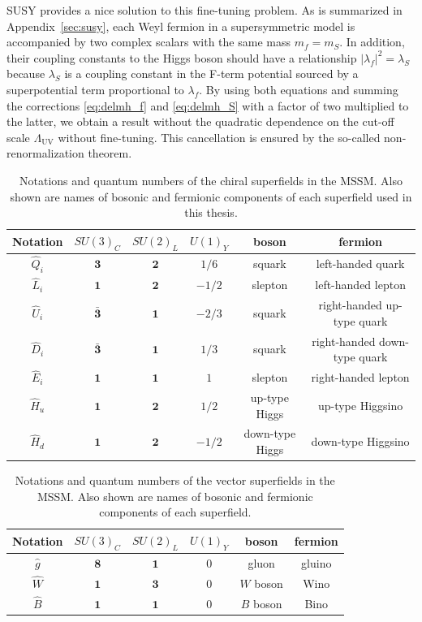 \documentclass[12pt,twoside,book]{article}
\begin{document}
SUSY provides a nice solution to this fine-tuning problem.
As is summarized in Appendix~\ref{sec:susy}, each Weyl fermion in a supersymmetric model is accompanied by two complex scalars with the same mass $m_f = m_S$.
In addition, their coupling constants to the Higgs boson should have a relationship $|\lambda_f|^2 = \lambda_S$ because $\lambda_S$ is a coupling constant in the F-term potential sourced by a superpotential term proportional to $\lambda_f$.
By using both equations and summing the corrections \eqref{eq:delmh_f} and \eqref{eq:delmh_S} with a factor of two multiplied to the latter, we obtain a result without the quadratic dependence on the cut-off scale $\Lambda_{\mathrm{UV}}$ without fine-tuning.
This cancellation is ensured by the so-called non-renormalization theorem. \cite{Salam:1974jj, Grisaru:1979wc}

\begin{table}[t]
  \centering
  \begin{tabular}{c|ccc|cc}
    Notation & $SU(3)_C$ & $SU(2)_L$ & $U(1)_Y$ & boson & fermion \\ \hline
    $\hat{Q}_i$ & $\bm{3}$ & $\bm{2}$ & $1/6$ & squark & left-handed quark \\
    $\hat{L}_i$ & $\bm{1}$ & $\bm{2}$ & $-1/2$ & slepton & left-handed lepton \\
    $\hat{U}_i$ & $\bar{\bm{3}}$ & $\bm{1}$ & $-2/3$ & squark & right-handed up-type quark \\
    $\hat{D}_i$ & $\bar{\bm{3}}$ & $\bm{1}$ & $1/3$ & squark & right-handed down-type quark \\
    $\hat{E}_i$ & $\bm{1}$ & $\bm{1}$ & $1$ & slepton & right-handed lepton\\
    $\hat{H}_u$ & $\bm{1}$ & $\bm{2}$ & $1/2$ & up-type Higgs & up-type Higgsino\\
    $\hat{H}_d$ & $\bm{1}$ & $\bm{2}$ & $-1/2$ & down-type Higgs & down-type Higgsino
  \end{tabular}
  \caption{
    Notations and quantum numbers of the chiral superfields in the MSSM.
    Also shown are names of bosonic and fermionic components of each superfield used in this thesis.
  }
  \label{tab:mssm_csf}
\end{table}

\begin{table}[t]
  \centering
  \begin{tabular}{c|ccc|cc}
    Notation & $SU(3)_C$ & $SU(2)_L$ & $U(1)_Y$ & boson & fermion \\ \hline
    $\hat{g}$ & $\bm{8}$ & $\bm{1}$ & $0$ & gluon & gluino \\
    $\hat{W}$ & $\bm{1}$ & $\bm{3}$ & $0$ & $W$ boson & Wino\\
    $\hat{B}$ & $\bm{1}$ & $\bm{1}$ & $0$ & $B$ boson & Bino\\
  \end{tabular}
  \caption{
    Notations and quantum numbers of the vector superfields in the MSSM.
    Also shown are names of bosonic and fermionic components of each superfield.}
  \label{tab:mssm_vsf}
\end{table}
\end{document}
